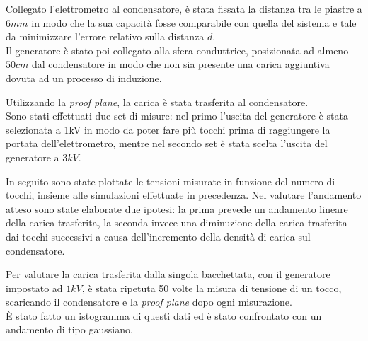 {\fontsize{12}{14}\selectfont 

Collegato l'elettrometro al condensatore, è stata fissata la distanza tra le piastre a $6mm$ in modo che la sua capacità fosse comparabile con quella del sistema e tale da minimizzare l'errore relativo sulla distanza $d$.
\\
Il generatore è stato poi collegato alla sfera conduttrice, posizionata ad almeno $50cm$ dal condensatore in modo che non sia presente una carica aggiuntiva dovuta ad un processo di induzione. 
\par
Utilizzando la \emph{proof plane}, la carica è stata trasferita al condensatore.
\\
Sono stati effettuati due set di misure: nel primo l'uscita del generatore è stata selezionata a 1kV in modo da poter fare più tocchi prima di raggiungere la portata dell'elettrometro, mentre nel secondo set è stata scelta l'uscita del generatore a $3kV$.
\par
In seguito sono state plottate le tensioni misurate in funzione del numero di tocchi, insieme alle simulazioni effettuate in precedenza. Nel valutare l'andamento atteso sono state elaborate due ipotesi: la prima prevede un andamento lineare della carica trasferita, la seconda invece una diminuzione della carica trasferita dai tocchi successivi a causa  dell'incremento della densità di carica sul condensatore.
\par
Per valutare la carica trasferita dalla singola bacchettata, con il generatore impostato ad $1kV$, è stata ripetuta 50 volte la misura di tensione di un tocco, scaricando il condensatore e la \emph{proof plane} dopo ogni misurazione.
\\
È stato fatto un istogramma di questi dati ed è stato confrontato con un andamento di tipo gaussiano.
\par}